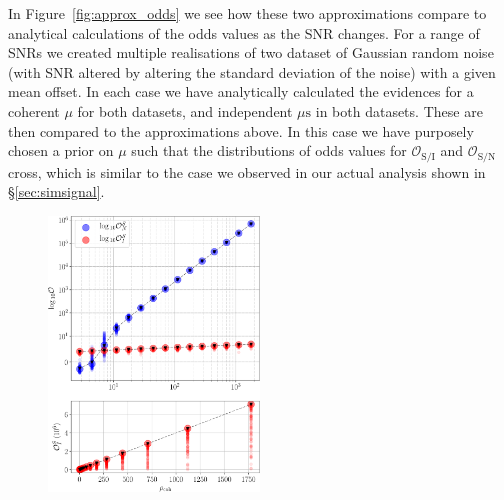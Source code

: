 In Figure~\ref{fig:approx_odds} we see how these two approximations compare to analytical calculations of the odds values as the SNR changes. For a range of SNRs
we created multiple realisations of two dataset of Gaussian random noise (with SNR altered by altering the standard deviation of the noise) with a given
mean offset. In each case we have analytically calculated the evidences for a coherent $\mu$ for both datasets, and independent $\mu\text{s}$ in both datasets.
These are then compared to the approximations above. In this case we have purposely chosen a prior on $\mu$ such that the distributions of odds values for
$\mathcal{O}_{\text{S}/\text{I}}$ and $\mathcal{O}_{\text{S}/\text{N}}$ cross, which is similar to the case we observed in our actual analysis shown in \S\ref{sec:simsignal}.

\begin{figure}[!phtb]
\begin{center}
\includegraphics[width=0.5\textwidth]{./figures/appendix3/approx_odds}
\caption{ \protect}
\end{center}
\end{figure}
